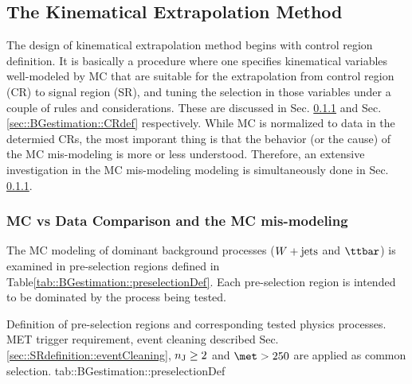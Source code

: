 \subsection{The Kinematical Extrapolation Method} \label{sec::BGestimation::kineExtp}
The design of kinematical extrapolation method begins with control region definition.
It is basically a procedure where one specifies kinematical variables well-modeled by MC that are suitable for the extrapolation from control region (CR) to signal region (SR), and tuning the selection in those variables under a couple of rules and considerations. These are discussed in Sec. \ref{sec::BGestimation::dataMC} and Sec. \ref{sec::BGestimation::CRdef} respectively. While MC is normalized to data in the determied CRs, the most imporant thing is that the behavior (or the cause) of the MC mis-modeling is more or less understood. 
Therefore, an extensive investigation in the MC mis-modeling modeling is simultaneously done in Sec. \ref{sec::BGestimation::dataMC}.  \\


\subsubsection{MC vs Data Comparison and the MC mis-modeling} \label{sec::BGestimation::dataMC}
The MC modeling of dominant background processes ($W+\mathrm{jets}$ and $\ttbar$) is examined in pre-selection regions defined in Table\ref{tab::BGestimation::preselectionDef}. Each pre-selection region is intended to be dominated by the process being tested. 

{Definition of pre-selection regions and corresponding tested physics processes. MET trigger requirement, event cleaning described Sec. \ref{sec::SRdefinition::eventCleaning}, $n_{\mathrm{J}} \geq 2$ and $\met>250$ are applied as common selection.}
{tab::BGestimation::preselectionDef}

